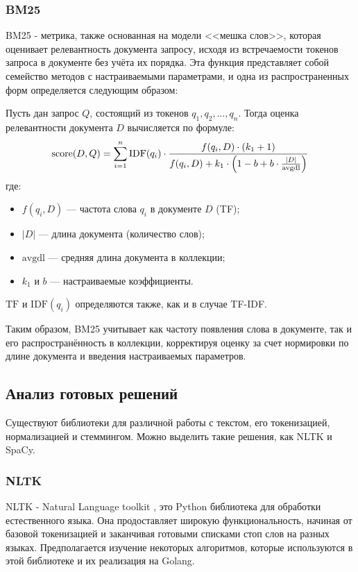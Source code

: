 \subsubsection{BM25}
BM25 - метрика, также основанная на модели <<мешка слов>>, которая оценивает релевантность документа запросу, исходя из встречаемости токенов 
запроса в документе без учёта их порядка. Эта функция представляет собой семейство методов с настраиваемыми 
параметрами, и одна из распространенных форм определяется следующим образом:

Пусть дан запрос \( Q \), состоящий из токенов \( q_1, q_2, \dots, q_n \). Тогда оценка релевантности документа \( D \) вычисляется по формуле:
\begin{align*}
    \mathrm{score}(D, Q) = \sum_{i=1}^{n} \mathrm{IDF}(q_i) \cdot \frac{f(q_i, D) \cdot (k_1 + 1)}{f(q_i, D) + k_1 \cdot \Bigl(1 - b + b \cdot \frac{|D|}{\mathrm{avgdl}}\Bigr)}
\end{align*}
где:
\begin{itemize}
    \item \( f(q_i, D) \) --- частота слова \( q_i \) в документе \( D \) (TF);
    \item \( |D| \) --- длина документа (количество слов);
    \item \( \mathrm{avgdl} \) --- средняя длина документа в коллекции;
    \item \( k_1 \) и \( b \) --- настраиваемые коэффициенты.
\end{itemize}

\( \mathrm{TF} \) и \( \mathrm{IDF}(q_i) \) определяются также, как и в случае TF-IDF.

Таким образом, BM25 учитывает как частоту появления слова в документе, так и его распространённость в коллекции, корректируя оценку за счет нормировки по длине документа и введения настраиваемых параметров.




\subsection{Анализ готовых решений}
Существуют библиотеки для различной работы с текстом, его токенизацией, нормализацией и стеммингом. Можно выделить такие решения, как NLTK и SpaCy. 

\subsubsection{NLTK}
NLTK - Natural Language toolkit \cite{nltk}, это Python библиотека для обработки естественного языка. Она продоставляет широкую 
функциональность, начиная от базовой токенизацией и заканчивая готовыми списками стоп слов на разных языках. 
Предполагается изучение некоторых алгоритмов, которые используются в этой библиотеке и их реализация на Golang. 

